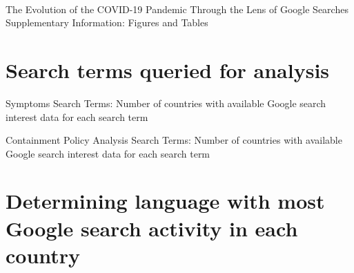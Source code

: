 \documentclass{article}
\begin{document}
\renewcommand{\thepage}{S\arabic{page}} 
\renewcommand{\thesection}{S\arabic{section}}  
\renewcommand{\thetable}{S\arabic{table}}  
\renewcommand{\thefigure}{S\arabic{figure}}

\thispagestyle{empty}
\begin{center}
~~ \\ 
\bigskip 
\bigskip 
\bigskip 
\bigskip 
\bigskip 
\bigskip 
\bigskip 
\bigskip 
\bigskip 
\bigskip 
\bigskip 
\bigskip 
\bigskip 
\bigskip 
    \Huge The Evolution of the COVID-19 Pandemic Through the Lens of Google Searches \\
    \bigskip
    \bigskip
    \bigskip
    \Huge Supplementary Information: Figures and Tables
\end{center}
    \bigskip
    \bigskip
    \bigskip
    \bigskip
    \bigskip
    \bigskip
    \bigskip
    \bigskip
    \bigskip
    \bigskip
    \bigskip
    \bigskip
    \bigskip
    \bigskip
    \bigskip
    \bigskip
    \bigskip
    \bigskip
    \bigskip
    \bigskip
    \bigskip
    \bigskip
    \bigskip

\newpage
\tableofcontents

\newpage
\section{Search terms queried for analysis}
\label{si:search_terms}

\begin{table}[H]
\caption{Symptoms Search Terms: Number of countries with available Google search interest data for each search term}
\label{tab:terms_queried_n_symptoms}
\centering

\end{table}

\begin{table}[H]
\caption{Containment Policy Analysis Search Terms: Number of countries with available Google search interest data for each search term}
\label{tab:terms_queried_n_contain}
\centering

\end{table}

\newpage
\section{Determining language with most Google search activity in each country}
\label{si:determine_language}
\end{document}
